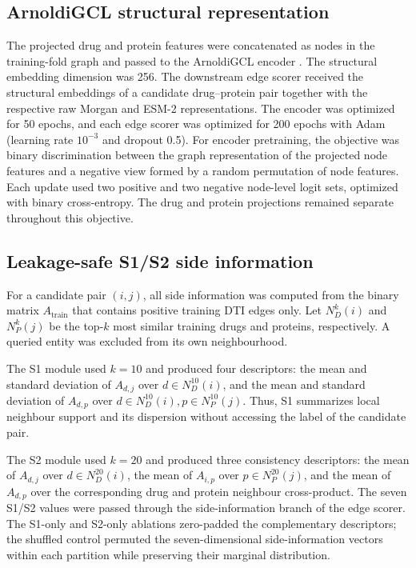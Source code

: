 \subsection{ArnoldiGCL structural representation}
The projected drug and protein features were concatenated as nodes in the
training-fold graph and passed to the ArnoldiGCL encoder
\cite{coskun2025arnoldigcl}. The structural
embedding dimension was 256. The downstream edge scorer received the structural
embeddings of a candidate drug--protein pair together with the respective raw
Morgan and ESM-2 representations. The encoder was optimized for 50 epochs, and
each edge scorer was optimized for 200 epochs with Adam (learning rate
$10^{-3}$ and dropout 0.5). For encoder pretraining, the objective was binary
discrimination between the graph representation of the projected node features
and a negative view formed by a random permutation of node features. Each
update used two positive and two negative node-level logit sets, optimized with
binary cross-entropy. The drug and protein projections remained separate
throughout this objective.

\subsection{Leakage-safe S1/S2 side information}
For a candidate pair $(i,j)$, all side information was computed from the binary
matrix $A_{\mathrm{train}}$ that contains positive training DTI edges only. Let
$N_D^k(i)$ and $N_P^k(j)$ be the top-$k$ most similar training drugs and
proteins, respectively. A queried entity was excluded from its own
neighbourhood.

The S1 module used $k=10$ and produced four descriptors: the mean and standard
deviation of $A_{d,j}$ over $d\in N_D^{10}(i)$, and the mean and standard
deviation of $A_{d,p}$ over $d\in N_D^{10}(i), p\in N_P^{10}(j)$. Thus, S1
summarizes local neighbour support and its dispersion without accessing the
label of the candidate pair.

The S2 module used $k=20$ and produced three consistency descriptors: the mean
of $A_{d,j}$ over $d\in N_D^{20}(i)$, the mean of $A_{i,p}$ over
$p\in N_P^{20}(j)$, and the mean of $A_{d,p}$ over the corresponding drug and
protein neighbour cross-product. The seven S1/S2 values were passed through the
side-information branch of the edge scorer. The S1-only and S2-only ablations
zero-padded the complementary descriptors; the shuffled control permuted the
seven-dimensional side-information vectors within each partition while
preserving their marginal distribution.

